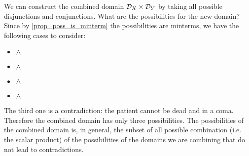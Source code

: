 \documentclass[11pt,letterpaper,fleqn]{memoir} %
\begin{document}
We can construct the combined domain $\mathcal{D}_X \times \mathcal{D}_Y$ by taking all possible disjunctions and conjunctions. What are the possibilities for the new domain? Since by \ref{prop_poss_is_minterm} the possibilities are minterms, we have the following cases to consider:
\begin{itemize}
	\item {} $\wedge$ 
	\item {} $\wedge$ 
	\item {} $\wedge$ 
	\item {} $\wedge$ 
\end{itemize}
The third one is a contradiction: the patient cannot be dead and in a coma. Therefore the combined domain has only three possibilities. The possibilities of the combined domain is, in general, the subset of all possible combination (i.e. the scalar product) of the possibilities of the domains we are combining that do not lead to contradictions.
\end{document}
